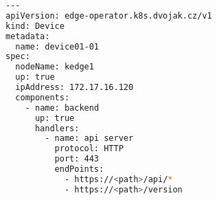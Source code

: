 \begin{lstfloat}
\begin{lstlisting}[language=bash, caption={Ukázka CRD device}, label={sample:device}]
---
apiVersion: edge-operator.k8s.dvojak.cz/v1
kind: Device
metadata:
  name: device01-01
spec:
  nodeName: kedge1
  up: true
  ipAddress: 172.17.16.120
  components:
    - name: backend
      up: true
      handlers:
        - name: api server
          protocol: HTTP
          port: 443
          endPoints:
            - https://<path>/api/*
            - https://<path>/version
\end{lstlisting}
\end{lstfloat}